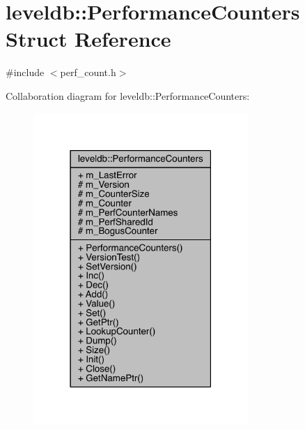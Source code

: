 \hypertarget{structleveldb_1_1_performance_counters}{}\section{leveldb\+:\+:Performance\+Counters Struct Reference}
\label{structleveldb_1_1_performance_counters}


{\ttfamily \#include $<$perf\+\_\+count.\+h$>$}



Collaboration diagram for leveldb\+:\+:Performance\+Counters\+:\nopagebreak
\begin{figure}[H]
\begin{center}
\leavevmode
\includegraphics[width=231pt]{structleveldb_1_1_performance_counters__coll__graph}
\end{center}
\end{figure}
